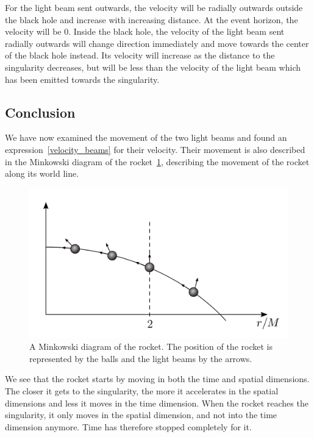 \documentclass[reprint,english,notitlepage]{revtex4-2}
\begin{document}
        For the light beam sent outwards, the velocity will be radially outwards outside the black hole and increase with increasing distance.
        At the event horizon, the velocity will be 0.
        Inside the black hole, the velocity of the light beam sent radially outwards will change direction immediately and move towards the center of the black hole instead.
        Its velocity will increase as the distance to the singularity decreases, but will be less than the velocity of the light beam which has been emitted towards the singularity.


    \subsection{Conclusion}\label{subsec:conclusion7}
        We have now examined the movement of the two light beams and found an expression~\eqref{velocity_beams} for their velocity.
        Their movement is also described in the Minkowski diagram of the rocket~\ref{fig:world_line}, describing the movement of the rocket along its world line.

        \begin{figure}[h]
            \centering
            \includegraphics[scale=0.2]{world_line}
            \caption{A Minkowski diagram of the rocket. The position of the rocket is represented by the balls and the light beams by the arrows.}\label{fig:world_line}
        \end{figure}

        We see that the rocket starts by moving in both the time and spatial dimensions.
        The closer it gets to the singularity, the more it accelerates in the spatial dimensions and less it moves in the time dimension.
        When the rocket reaches the singularity, it only moves in the spatial dimension, and not into the time dimension anymore.
        Time has therefore stopped completely for it.\\
\end{document}
